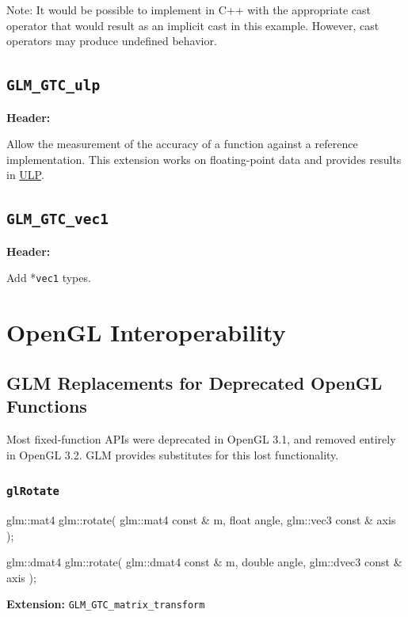 \documentclass{scrartcl}
\numberwithin{figure}{subsection}
\begin{document}
Note: It would be possible to implement  in C++ with the appropriate cast operator that would result as an implicit cast in this example. However, cast operators may produce undefined behavior.

\subsection{\texttt{GLM\_GTC\_ulp}}
\textbf{Header:} 

Allow the measurement of the accuracy of a function against a reference implementation. This extension works on floating-point data and provides results in \href{http://ljk.imag.fr/membres/Carine.Lucas/TPScilab/JMMuller/ulp-toms.pdf}{ULP}.

\subsection{\texttt{GLM\_GTC\_vec1}}
\textbf{Header:} 

Add *\verb|vec1| types.

\newpage{}

\section{OpenGL Interoperability}

\subsection{GLM Replacements for Deprecated OpenGL Functions}

Most fixed-function APIs were deprecated in OpenGL 3.1, and removed entirely in OpenGL 3.2.  GLM provides substitutes for this lost functionality.

\subsubsection{\texttt{glRotate}}

\begin{cppcode}
glm::mat4 glm::rotate(
  glm::mat4 const & m,
  float angle, 
  glm::vec3 const & axis
);

glm::dmat4 glm::rotate(
  glm::dmat4 const & m,
  double angle, 
  glm::dvec3 const & axis
);
\end{cppcode}

\textbf{Extension:} \verb|GLM_GTC_matrix_transform|
\end{document}
